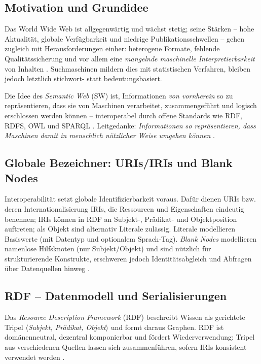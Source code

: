 \subsection{Motivation und Grundidee}

Das World Wide Web ist allgegenwärtig und wächst stetig; seine Stärken -- hohe Aktualität, globale Verfügbarkeit und niedrige Publikationsschwellen -- gehen zugleich mit Herausforderungen einher: heterogene Formate, fehlende Qualitätssicherung und vor allem eine \emph{mangelnde maschinelle Interpretierbarkeit} von Inhalten \cite{Hitzler}. Suchmaschinen mildern dies mit statistischen Verfahren, bleiben jedoch letztlich stichwort- statt bedeutungsbasiert. 

Die Idee des \emph{Semantic Web} (SW) ist, Informationen \emph{von vornherein} so zu repräsentieren, dass sie von Maschinen verarbeitet, zusammengeführt und logisch erschlossen werden können -- interoperabel durch offene Standards wie RDF, RDFS, OWL und SPARQL \cite{Hitzler,AntoniouVanHarmelen}. Leitgedanke: \emph{Informationen so repräsentieren, dass Maschinen damit in menschlich nützlicher Weise umgehen können} \cite{Hitzler}.


\subsection{Globale Bezeichner: URIs/IRIs und Blank Nodes}

Interoperabilität setzt globale Identifizierbarkeit voraus. Dafür dienen URIs bzw. deren Internationalisierung IRIs, die Ressourcen und Eigenschaften eindeutig benennen; IRIs können in RDF an Subjekt-, Prädikat- und Objektposition auftreten; als Objekt sind alternativ Literale zulässig. Literale modellieren Basiswerte (mit Datentyp und optionalem Sprach-Tag). \emph{Blank Nodes} modellieren namenlose Hilfsknoten (nur Subjekt/Objekt) und sind nützlich für strukturierende Konstrukte, erschweren jedoch Identitätsabgleich und Abfragen über Datenquellen hinweg \cite{RDF11Primer,Hitzler}.

\subsection{RDF -- Datenmodell und Serialisierungen}
\label{subsec:rdf}

Das \emph{Resource Description Framework} (RDF) beschreibt Wissen als gerichtete Tripel
\(\langle\)\emph{Subjekt, Prädikat, Objekt}\(\rangle\) und formt daraus Graphen. RDF ist domänenneutral, dezentral komponierbar und fördert Wiederverwendung: Tripel aus verschiedenen Quellen lassen sich zusammenführen, sofern IRIs konsistent verwendet werden \cite{RDF11Primer,AntoniouVanHarmelen,Hitzler}.

